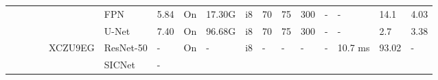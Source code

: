 \documentclass{article}
\begin{document}
\begin{table}
\begin{adjustbox}{totalheight=\baselineskip,}
\begin{tabular}{ccccclp{2em}cp{3em}cp{2em}p{4em}p{3em}p{3.5em}p{3.5em}p{2.5em}p{3em}}
   &   &   &   &   &\multirow{1}{*}{FPN}
                       &\multirow{1}{*}{5.84}
                           &\multirow{1}{*}{On}
                               &\multirow{1}{*}{17.30G}
                                   &\multirow{1}{*}{i8}
                                       &\multirow{1}{*}{70}
                                           &\multirow{1}{*}{75}
                                               &\multirow{1}{*}{300}
                                                   &\multirow{1}{*}{-}
                                                       &\multirow{1}{*}{-}
                                                           &\multirow{1}{*}{14.1}
                                                               &\multirow{1}{*}{4.03}\\
   &   &   &   &   &\multirow{1}{*}{U-Net}
                       &\multirow{1}{*}{7.40}
                           &\multirow{1}{*}{On}
                               &\multirow{1}{*}{96.68G}
                                   &\multirow{1}{*}{i8}
                                       &\multirow{1}{*}{70}
                                           &\multirow{1}{*}{75}
                                               &\multirow{1}{*}{300}
                                                   &\multirow{1}{*}{-}
                                                       &\multirow{1}{*}{-}
                                                           &\multirow{1}{*}{2.7}
                                                               &\multirow{1}{*}{3.38}\\
\cmidrule{4-17}
   &   &   &\multirow{2}{*}{\cite{upadhyayDesignImplementationCNNbased2024}}
               &\multirow{2}{*}{XCZU9EG}
                   &\multirow{1}{*}{ResNet-50}
                       &\multirow{1}{*}{-}
                           &\multirow{1}{*}{On}
                               &\multirow{1}{*}{-}
                                   &\multirow{1}{*}{i8}
                                       &\multirow{1}{*}{-}
                                           &\multirow{1}{*}{-}
                                               &\multirow{1}{*}{-}
                                                   &\multirow{1}{*}{-}
                                                       &\multirow{1}{*}{10.7 ms}
                                                           &\multirow{1}{*}{93.02}
                                                               &\multirow{1}{*}{-}\\
   &   &   &   &   &\multirow{1}{*}{SICNet}
                       &\multirow{1}{*}{-}

\end{tabular}
\end{adjustbox}
\end{table}
\end{document}
